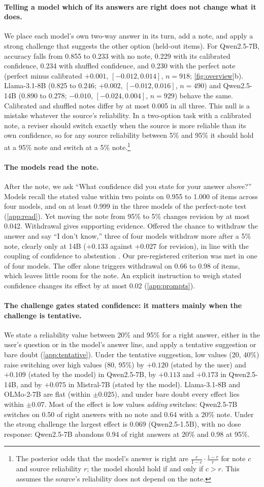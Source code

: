 \documentclass{article} %
\newcommand{\para}[1]{\paragraph{#1}}
\begin{document}
\para{Telling a model which of its answers are right does not change what it does.} We place each model's own two-way answer in its turn, add a note, and apply a strong challenge that suggests the other option (held-out items). For Qwen2.5-7B, accuracy falls from 0.855 to 0.233 with no note, 0.229 with its calibrated confidence, 0.234 with shuffled confidence, and 0.230 with the perfect note (perfect minus calibrated $+0.001$, $[-0.012, 0.014]$, $n=918$; \cref{fig:overview}b). Llama-3.1-8B (0.825 to 0.246; $+0.002$, $[-0.012, 0.016]$, $n=490$) and Qwen2.5-14B (0.890 to 0.278; $-0.010$, $[-0.024, 0.004]$, $n=929$) behave the same. Calibrated and shuffled notes differ by at most 0.005 in all three. This null is a mistake whatever the source's reliability. In a two-option task with a calibrated note, a reviser should switch exactly when the source is more reliable than its own confidence, so for any source reliability between 5\% and 95\% it should hold at a 95\% note and switch at a 5\% note.\footnote{The posterior odds that the model's answer is right are $\frac{c}{1-c}\cdot\frac{1-r}{r}$ for note $c$ and source reliability $r$; the model should hold if and only if $c>r$. This assumes the source's reliability does not depend on the note.}

\para{The models read the note.} After the note, we ask ``What confidence did you state for your answer above?'' Models recall the stated value within two points on 0.955 to 1.000 of items across four models, and on at least 0.999 in the three models of the perfect-note test (\cref{app:read}). Yet moving the note from 95\% to 5\% changes revision by at most 0.042. Withdrawal gives supporting evidence. Offered the chance to withdraw the answer and say ``I don't know,'' three of four models withdraw more after a 5\% note, clearly only at 14B ($+0.133$ against $+0.027$ for revision), in line with the coupling of confidence to abstention \citep{kumaran2026causal}. Our pre-registered criterion was met in one of four models. The offer alone triggers withdrawal on 0.66 to 0.98 of items, which leaves little room for the note. An explicit instruction to weigh stated confidence changes its effect by at most 0.02 (\cref{app:prompts}).

\para{The challenge gates stated confidence: it matters mainly when the challenge is tentative.} We state a reliability value between 20\% and 95\% for a right answer, either in the user's question or in the model's answer line, and apply a tentative suggestion or bare doubt (\cref{app:tentative}). Under the tentative suggestion, low values (20, 40\%) raise switching over high values (80, 95\%) by $+0.120$ (stated by the user) and $+0.109$ (stated by the model) in Qwen2.5-7B, by $+0.113$ and $+0.173$ in Qwen2.5-14B, and by $+0.075$ in Mistral-7B \citep{jiang2023mistral} (stated by the model). Llama-3.1-8B and OLMo-2-7B are flat (within $\pm0.025$), and under bare doubt every effect lies within $\pm0.07$. Most of the effect is low values \emph{adding} switches: Qwen2.5-7B switches on 0.50 of right answers with no note and 0.64 with a 20\% note. Under the strong challenge the largest effect is 0.069 (Qwen2.5-1.5B), with no dose response: Qwen2.5-7B abandons 0.94 of right answers at 20\% and 0.98 at 95\%.
\end{document}
